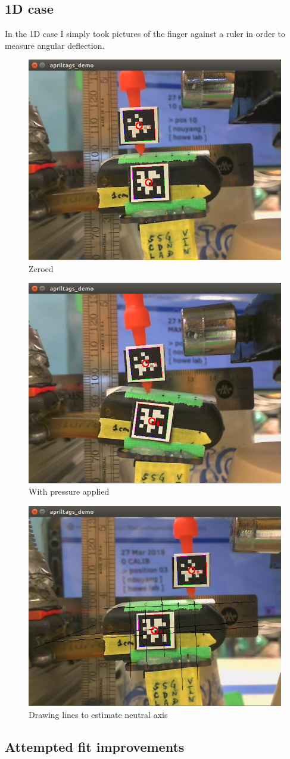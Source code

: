 \documentclass[12pt]{article}
\begin{document}

\subsection{1D case}

In the 1D case I simply took pictures of the finger against a ruler in order to measure angular deflection. 

\begin{figure}[H]
\centering
\includegraphics[width=.3\textwidth]{images/1d/zero.png}
\caption{Zeroed}
\end{figure}

\begin{figure}[H]
\centering
\includegraphics[width=.3\textwidth]{images/1d/weighted.png}
\caption{With pressure applied}
\end{figure}

\begin{figure}[H]
\centering
\includegraphics[width=.3\textwidth]{images/1d/torque_calc.jpg}
\caption{Drawing lines to estimate neutral axis}
\end{figure}

\subsection{Attempted fit improvements}
\end{document}
